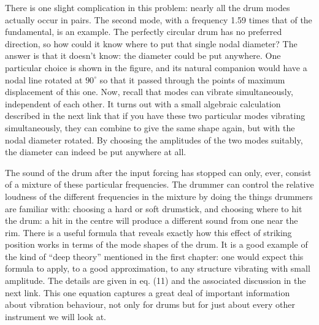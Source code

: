 
  There is one slight complication in this problem: nearly all the drum modes 
  actually occur in pairs. The second mode, with a frequency 1.59 times that of 
  the fundamental, is an example. The perfectly circular drum has no preferred 
  direction, so how could it know where to put that single nodal diameter? The 
  answer is that it doesn't know: the diameter could be put anywhere. One 
  particular choice is shown in the figure, and its natural companion would 
  have a nodal line rotated at $90^\circ$ so that it passed through the points 
  of maximum displacement of this one. Now, recall that modes can vibrate 
  simultaneously, independent of each other. It turns out with a small 
  algebraic calculation described in the next link that if you have these two 
  particular modes vibrating simultaneously, they can combine to give the same 
  shape again, but with the nodal diameter rotated. By choosing the amplitudes 
  of the two modes suitably, the diameter can indeed be put anywhere at all. 

  The sound of the drum after the input forcing has stopped can only, ever, 
  consist of a mixture of these particular frequencies. The drummer can control 
  the relative loudness of the different frequencies in the mixture by doing 
  the things drummers are familiar with: choosing a hard or soft drumstick, and 
  choosing where to hit the drum: a hit in the centre will produce a different 
  sound from one near the rim. There is a useful formula that reveals exactly 
  how this effect of striking position works in terms of the mode shapes of the 
  drum. It is a good example of the kind of ``deep theory'' mentioned in the 
  first chapter: one would expect this formula to apply, to a good 
  approximation, to any structure vibrating with small amplitude. The details 
  are given in eq. (11) and the associated discussion in the next link. This 
  one equation captures a great deal of important information about vibration 
  behaviour, not only for drums but for just about every other instrument we 
  will look at. 

